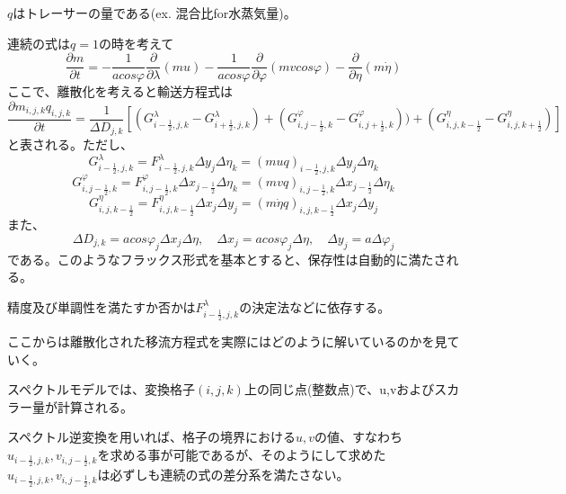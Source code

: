 \documentclass{jsbook}
\begin{document}
$q$はトレーサーの量である(ex. 混合比for水蒸気量)。

連続の式は$q=1$の時を考えて
\begin{equation}
  \frac{\partial m}{\partial t} = - \frac{1}{a cos \varphi} \frac{\partial}{\partial \lambda}(mu)- \frac{1}{a cos \varphi} \frac{\partial}{\partial \varphi}(mv cos \varphi)- \frac{\partial}{\partial \eta} (m \dot{\eta})  
\end{equation}
ここで、離散化を考えると輸送方程式は
\begin{equation}
\label{a1}
  \frac{\partial m_{i,j,k} q_{i,j,k}}{\partial t}=\frac{1}{\Delta D_{j,k}}[(G^{\lambda}_{i-\frac{1}{2},j,k}-G^{\lambda}_{i+\frac{1}{2},j,k})+(G^{\varphi}_{i,j-\frac{1}{2},k}-G^{\varphi}_{i,j+\frac{1}{2},k}))+(G^{\eta}_{i,j,k-\frac{1}{2}}-G^{\eta}_{i,j,k+\frac{1}{2}})]
\end{equation}
と表される。ただし、
\begin{equation}
  G^{\lambda}_{i-\frac{1}{2},j,k}=F^{\lambda}_{i-\frac{1}{2},j,k} \Delta y_{j} \Delta \eta_{k}=(muq)_{i-\frac{1}{2},j,k} \Delta y_{j} \Delta \eta_{k}
\end{equation}
\begin{equation}
  G^{\varphi}_{i,j-\frac{1}{2},k}=F^{\varphi}_{i,j-\frac{1}{2},k} \Delta x_{j-\frac{1}{2}} \Delta \eta_{k}=(mvq)_{i,j-\frac{1}{2},k} \Delta x_{j-\frac{1}{2}} \Delta \eta_{k}
\end{equation}
\begin{equation}
  G^{\eta}_{i,j,k-\frac{1}{2}}=F^{\eta}_{i,j,k-\frac{1}{2}} \Delta x_{j} \Delta y_{j}=(m \dot{\eta} q)_{i,j,k-\frac{1}{2}} \Delta x_{j} \Delta y_{j}
\end{equation}
また、
\begin{equation}
  \Delta D_{j,k}=a cos \varphi_{j} \Delta x_{j} \Delta \eta,\quad \Delta x_{j}=a cos \varphi_{j} \Delta \eta,\quad \Delta y_{j}=a \Delta \varphi_{j}
\end{equation}
である。このようなフラックス形式を基本とすると、保存性は自動的に満たされる。

精度及び単調性を満たすか否かは$F^{\lambda}_{i-\frac{1}{2},j,k}$の決定法などに依存する。

ここからは離散化された移流方程式を実際にはどのように解いているのかを見ていく。

スペクトルモデルでは、変換格子$(i,j,k)$上の同じ点(整数点)で、u,vおよびスカラー量が計算される。

スペクトル逆変換を用いれば、格子の境界における$u,v$の値、すなわち$u_{i-\frac{1}{2},j,k},v_{i,j-\frac{1}{2},k}$を求める事が可能であるが、そのようにして求めた$u_{i-\frac{1}{2},j,k},v_{i,j-\frac{1}{2},k}$は必ずしも連続の式の差分系を満たさない。
\end{document}
